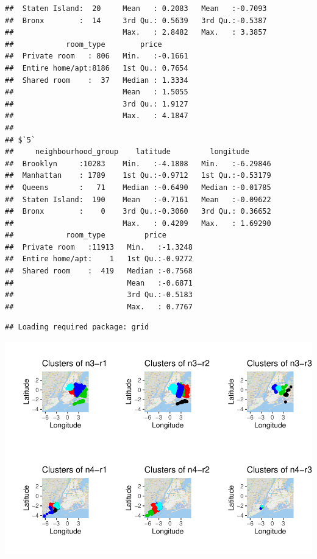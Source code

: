 \documentclass[
]{article}
\newenvironment{Shaded}{\begin{snugshade}}{\end{snugshade}}
\newcommand{\DataTypeTok}[1]{\textcolor[rgb]{0.13,0.29,0.53}{#1}}
\newcommand{\DecValTok}[1]{\textcolor[rgb]{0.00,0.00,0.81}{#1}}
\newcommand{\KeywordTok}[1]{\textcolor[rgb]{0.13,0.29,0.53}{\textbf{#1}}}
\newcommand{\NormalTok}[1]{#1}
\newcommand{\OperatorTok}[1]{\textcolor[rgb]{0.81,0.36,0.00}{\textbf{#1}}}
\begin{document}
\begin{verbatim}
##  Staten Island:  20     Mean   : 0.2083   Mean   :-0.7093  
##  Bronx        :  14     3rd Qu.: 0.5639   3rd Qu.:-0.5387  
##                         Max.   : 2.8482   Max.   : 3.3857  
##            room_type        price        
##  Private room   : 806   Min.   :-0.1661  
##  Entire home/apt:8186   1st Qu.: 0.7654  
##  Shared room    :  37   Median : 1.3334  
##                         Mean   : 1.5055  
##                         3rd Qu.: 1.9127  
##                         Max.   : 4.1847  
## 
## $`5`
##     neighbourhood_group    latitude         longitude       
##  Brooklyn     :10283    Min.   :-4.1808   Min.   :-6.29846  
##  Manhattan    : 1789    1st Qu.:-0.9712   1st Qu.:-0.53179  
##  Queens       :   71    Median :-0.6490   Median :-0.01785  
##  Staten Island:  190    Mean   :-0.7161   Mean   :-0.09622  
##  Bronx        :    0    3rd Qu.:-0.3060   3rd Qu.: 0.36652  
##                         Max.   : 0.4209   Max.   : 1.69290  
##            room_type         price        
##  Private room   :11913   Min.   :-1.3248  
##  Entire home/apt:    1   1st Qu.:-0.9272  
##  Shared room    :  419   Median :-0.7568  
##                          Mean   :-0.6871  
##                          3rd Qu.:-0.5183  
##                          Max.   : 0.7767
\end{verbatim}

\begin{Shaded}
\end{Shaded}

\begin{verbatim}
## Loading required package: grid
\end{verbatim}

\includegraphics{project-code_files/figure-latex/unnamed-chunk-22-1.pdf}
\end{document}
